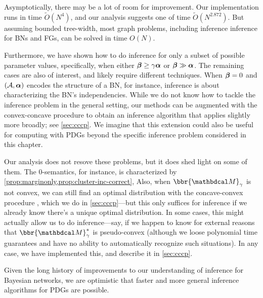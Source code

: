Asymptotically, there may be a lot of room for improvement.
Our implementation runs in time $\tilde O(N^4)$, and our analysis suggests one of time $\tilde O(N^{2.872})$. 
But assuming bounded tree-width, most graph problems, including
inference inference for BNs and FGs, can be solved in time $O(N)$. 


Furthermore, we have shown how to do inference for only a subset of
possible parameter values, specifically, 
when
either $\boldsymbol\beta \ge \gamma \boldsymbol\alpha$ or $\boldsymbol\beta \gg \boldsymbol\alpha$. 
The remaining cases are also of interest, and likely require different techniques. 
When $\boldsymbol\beta = 0$ and $(\mathcal A, \boldsymbol\alpha)$ encodes the structure of a BN,
    for instance,
    inference is about characterizing the BN's independencies.
While we do not know how to tackle 
the inference problem in the general setting, 
our methods can be augmented with the convex-concave procedure 
    \parencite{yuille2003concave} to obtain an inference
    algorithm that applies slightly more broadly; see \cref{sec:cccp}.
We imagine that this extension could also be useful for computing with PDGs 
    beyond the specific inference problem considered in this chapter.

Our analysis does not resove these problems, but it
    does shed light on some of them.  
The $0$-semantics, for instance, is 
characterized by \cref{prop:marginonly,prop:cluster-inc-correct}, 
Also, when $\bbr{\dg M}_\gamma$ is not convex, we can still find an optimal distribution with the concave-convex procedure \cite{yuille2003concave}, which we do in \cref{sec:cccp}---but this only suffices for inference if we already know there's a unique optimal distribution.
In some cases, this might actually allow us to do inference---say, if we happen to know for external reasons that $\bbr{\dg M}^*_\gamma$ is pseudo-convex (although we loose polynomial time guarantees and have no ability to automatically recognize such situations). In any case, we have implemented this, and describe it in \cref{sec:cccp}.


Given the long history of improvements to our
understanding of inference for 
    Bayesian networks,
we are optimistic that 
    faster and more general
    inference algorithms
    for PDGs
    are possible.



